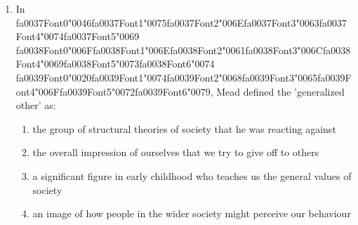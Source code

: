 \documentclass[12pt]{article}
\begin{document}
\begin{enumerate}[label=\arabic*.]
\begin{enumerate}[label=(\alph*)]
    \item a means of transporting money between different areas of a country
    \item an empire with a bureaucratic administration but no political centre
    \item an awareness of risks and dangers that affect the environment as a whole
    \item a unit with a division of labour that extends across ethnic and cultural groups
\end{enumerate}
\item In {\csname fa0037Font0\endcsname\char"0046}{\csname fa0037Font1\endcsname\char"0075}{\csname fa0037Font2\endcsname\char"006E}{\csname fa0037Font3\endcsname\char"0063}{\csname fa0037Font4\endcsname\char"0074}{\csname fa0037Font5\endcsname\char"0069} {\csname fa0038Font0\endcsname\char"006F}{\csname fa0038Font1\endcsname\char"006E}{\csname fa0038Font2\endcsname\char"0061}{\csname fa0038Font3\endcsname\char"006C}{\csname fa0038Font4\endcsname\char"0069}{\csname fa0038Font5\endcsname\char"0073}{\csname fa0038Font6\endcsname\char"0074} {\csname fa0039Font0\endcsname\char"0020}{\csname fa0039Font1\endcsname\char"0074}{\csname fa0039Font2\endcsname\char"0068}{\csname fa0039Font3\endcsname\char"0065}{\csname fa0039Font4\endcsname\char"006F}{\csname fa0039Font5\endcsname\char"0072}{\csname fa0039Font6\endcsname\char"0079}, Mead defined the 'generalized other' as:
\begin{enumerate}[label=(\alph*)]
    \item the group of structural theories of society that he was reacting against
    \item the overall impression of ourselves that we try to give off to others
    \item a significant figure in early childhood who teaches us the general values of society
    \item an image of how people in the wider society might perceive our behaviour
\end{enumerate}

\end{enumerate}
\end{document}
